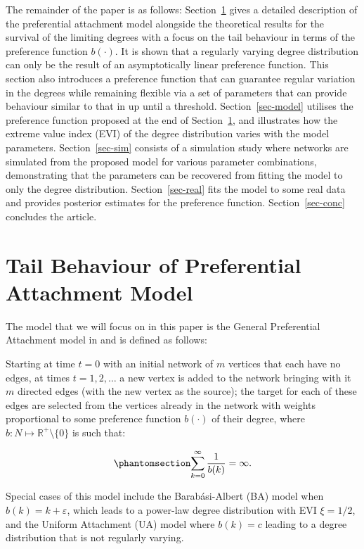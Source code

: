 \documentclass[
  sn-basic,
]{sn-jnl}
\theoremstyle{plain}
\theoremstyle{plain}
\theoremstyle{remark}
\begin{document}
The remainder of the paper is as follows: Section~\ref{sec-tail} gives a
detailed description of the preferential attachment model alongside the
theoretical results for the survival of the limiting degrees with a
focus on the tail behaviour in terms of the preference function
\(b(\cdot)\). It is shown that a regularly varying degree distribution
can only be the result of an asymptotically linear preference function.
This section also introduces a preference function that can guarantee
regular variation in the degrees while remaining flexible via a set of
parameters that can provide behaviour similar to that in
\citet{krapivsky01} up until a threshold. Section~\ref{sec-model}
utilises the preference function proposed at the end of
Section~\ref{sec-tail}, and illustrates how the extreme value index
(EVI) of the degree distribution varies with the model parameters.
Section~\ref{sec-sim} consists of a simulation study where networks are
simulated from the proposed model for various parameter combinations,
demonstrating that the parameters can be recovered from fitting the
model to only the degree distribution. Section~\ref{sec-real} fits the
model to some real data and provides posterior estimates for the
preference function. Section~\ref{sec-conc} concludes the article.

\newpage

\section{Tail Behaviour of Preferential Attachment
Model}\label{sec-tail}

The model that we will focus on in this paper is the General
Preferential Attachment model in \citet{rudas07} and is defined as
follows:

Starting at time \(t=0\) with an initial network of \(m\) vertices that
each have no edges, at times \(t=1,2,\ldots\) a new vertex is added to
the network bringing with it \(m\) directed edges (with the new vertex
as the source); the target for each of these edges are selected from the
vertices already in the network with weights proportional to some
preference function \(b(\cdot)\) of their degree, where
\(b: N \mapsto \mathbb R^+\setminus\{0\}\) is such that:

\begin{equation}\phantomsection\label{eq-condb2}{
\sum_{k=0}^\infty\frac{1}{b(k)} = \infty.
}\end{equation}

Special cases of this model include the Barabási-Albert (BA) model when
\(b(k) = k+\varepsilon\), which leads to a power-law degree distribution
with EVI \(\xi=1/2\), and the Uniform Attachment (UA) model where
\(b(k)=c\) leading to a degree distribution that is not regularly
varying.
\end{document}
